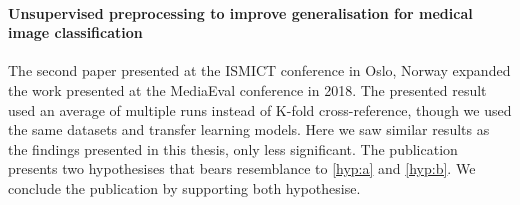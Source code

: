 \paragraph{Unsupervised preprocessing to improve generalisation for medical image classification~\cite{Mathias2019IEEpaper}}
The second paper presented at the ISMICT conference in Oslo, Norway expanded the work presented at the MediaEval conference in 2018.
The presented result used an average of multiple runs instead of K-fold cross-reference, though we used the same datasets and transfer learning models.
Here we saw similar results as the findings presented in this thesis, only less significant. The publication presents two hypothesises that bears resemblance to \ref{hyp:a} and \ref{hyp:b}. We conclude the publication by supporting both hypothesise.




